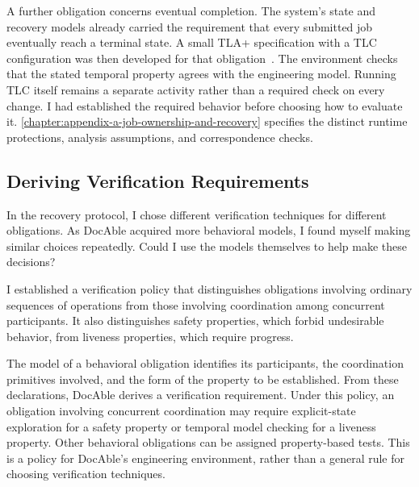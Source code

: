A further obligation concerns eventual completion. The system's state and recovery models already carried the requirement that every submitted job eventually reach a terminal state. A small TLA+ specification with a TLC configuration was then developed for that obligation~\citep{lamport2002}. The environment checks that the stated temporal property agrees with the engineering model. Running TLC itself remains a separate activity rather than a required check on every change. I had established the required behavior before choosing how to evaluate it. \autoref{chapter:appendix-a-job-ownership-and-recovery} specifies the distinct runtime protections, analysis assumptions, and correspondence checks.

\subsection{Deriving Verification Requirements}\label{heading:deriving-verification-requirements}

In the recovery protocol, I chose different verification techniques for different obligations. As DocAble acquired more behavioral models, I found myself making similar choices repeatedly. Could I use the models themselves to help make these decisions?

I established a verification policy that distinguishes obligations involving ordinary sequences of operations from those involving coordination among concurrent participants. It also distinguishes safety properties, which forbid undesirable behavior, from liveness properties, which require progress.

The model of a behavioral obligation identifies its participants, the coordination primitives involved, and the form of the property to be established. From these declarations, DocAble derives a verification requirement. Under this policy, an obligation involving concurrent coordination may require explicit-state exploration for a safety property or temporal model checking for a liveness property. Other behavioral obligations can be assigned property-based tests. This is a policy for DocAble's engineering environment, rather than a general rule for choosing verification techniques.


